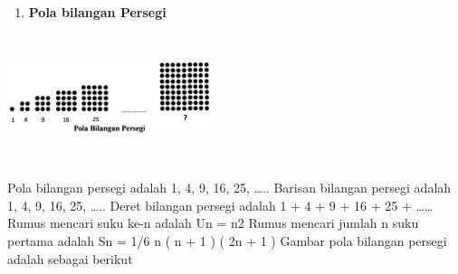 \documentclass[11pt,fleqn]{book} %
\begin{document}
\noindent
\begin{enumerate}
	\item  \textbf{ Pola bilangan Persegi}
\end{enumerate}
\noindent
\begin{center}
	\noindent \includegraphics*[width=2.32in, height=1.48in, keepaspectratio=false, trim=0.00in 0.11in 0.00in 0.00in]{Pictures/24.PNG}
\end{center}
\noindent
\noindent Pola bilangan persegi adalah 1, 4, 9, 16, 25, …..
\noindent Barisan bilangan persegi adalah 1, 4, 9, 16, 25, …..
\noindent Deret bilangan persegi adalah 1 + 4 + 9 + 16 + 25 + ……
\noindent Rumus mencari suku ke-n adalah Un = n2
\noindent Rumus mencari jumlah n suku pertama adalah Sn = 1/6 n ( n + 1 ) ( 2n + 1 )
\noindent Gambar pola bilangan persegi adalah sebagai berikut
\end{document}
